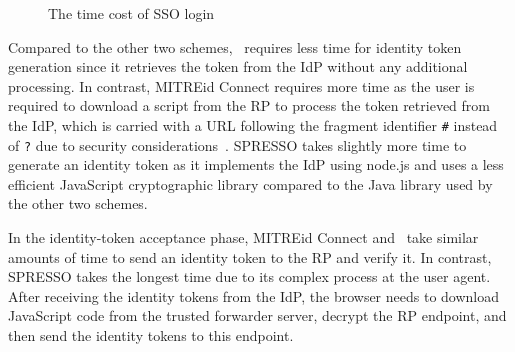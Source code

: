 \begin{figure}[tb]
  \centering
  \caption{The time cost of SSO login}
  \label{fig:evaluation}
\end{figure}

Compared to the other two schemes, \usso~requires less time for identity token generation since it retrieves the token from the IdP without any additional processing. In contrast, 
MITREid Connect requires more time as the user is required to download a script from the RP to process the token retrieved from the IdP, which is carried with a URL following the fragment identifier \verb+#+ instead of \verb+?+ due to security considerations~\cite{de2014oauth}. SPRESSO takes slightly more time to generate an identity token as it implements the IdP using node.js and uses a less efficient JavaScript cryptographic library compared to the Java library used by the other two schemes.

In the identity-token acceptance phase, MITREid Connect and \usso~take similar amounts of time to send an identity token to the RP and verify it. In contrast, SPRESSO takes the longest time due to its complex process at the user agent. After receiving the identity tokens from the IdP, the browser needs to download JavaScript code from the trusted forwarder server, decrypt the RP endpoint, and then send the identity tokens to this endpoint.


